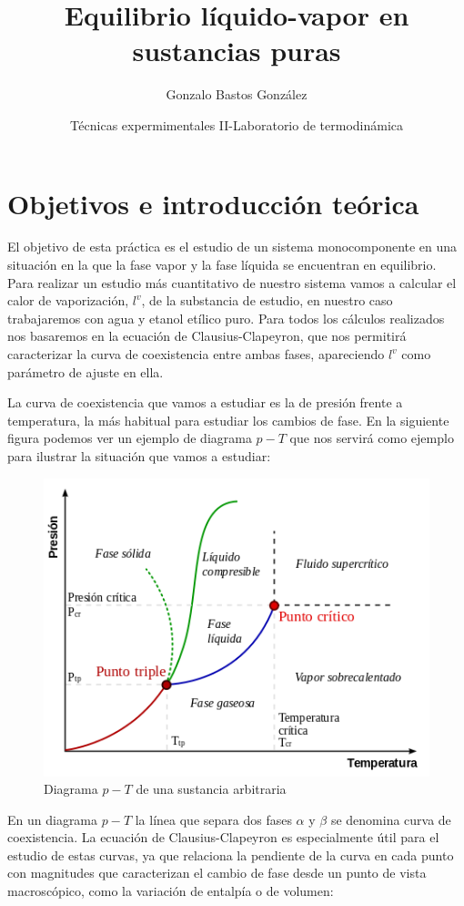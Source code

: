 \documentclass[a4paper,12pt,titlepage]{article}
\title{Equilibrio líquido-vapor en sustancias puras}
\author{Gonzalo Bastos González}
\date{Técnicas expermimentales II-Laboratorio de termodinámica}
\begin{document}
\maketitle
\tableofcontents

\newpage

\section{Objetivos e introducción teórica}

El objetivo de esta práctica es el estudio de un sistema monocomponente en una situación en la que la fase vapor y la fase líquida se encuentran en equilibrio. Para realizar un estudio más cuantitativo de nuestro sistema vamos a calcular el calor de vaporización, $l^v$, de la substancia de estudio, en nuestro caso trabajaremos con agua y etanol etílico puro. Para todos los cálculos realizados nos basaremos en la ecuación de Clausius-Clapeyron, que nos permitirá caracterizar la curva de coexistencia entre ambas fases, apareciendo $l^v$ como parámetro de ajuste en ella.

La curva de coexistencia que vamos a estudiar es la de presión frente a temperatura, la más habitual para estudiar los cambios de fase. En la siguiente figura podemos ver un ejemplo de diagrama $p-T$ que nos servirá como ejemplo para ilustrar la situación que vamos a estudiar:

\begin{figure}[h!]
    \centering
    \includegraphics[width=0.55\linewidth]{ELV simple/diag_fases.png}
    \caption{Diagrama $p-T$ de una sustancia arbitraria}
    \label{fig:enter-label}
\end{figure}

En un diagrama $p-T$ la línea que separa dos fases $\alpha$ y $\beta$ se denomina curva de coexistencia. La ecuación de Clausius-Clapeyron es especialmente útil para el estudio de estas curvas, ya que relaciona la pendiente de la curva en cada punto con magnitudes que caracterizan el cambio de fase desde un punto de vista macroscópico, como la variación de entalpía o de volumen:
\end{document}
